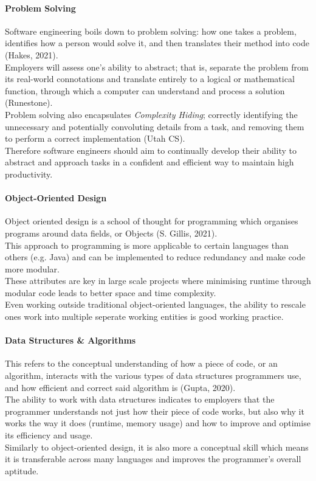 \documentclass[a4paper, 11pt]{report}
\begin{document}
	\paragraph{Problem Solving} Software engineering boils down to problem solving: how one takes a problem, identifies how a person would solve it, and then translates their method into code (Hakes, 2021).
	\\Employers will assess one's ability to abstract; that is, separate the problem from its real-world connotations and translate entirely to a logical or mathematical function, through which a computer can understand and process a solution (Runestone).
	\\Problem solving also encapsulates \textit{Complexity Hiding}; correctly identifying the unnecessary and potentially convoluting details from a task, and removing them to perform a correct implementation (Utah CS).
	\\Therefore software engineers should aim to continually develop their ability to abstract and approach tasks in a confident and efficient way to maintain high productivity.

	\paragraph{Object-Oriented Design} Object oriented design is a school of thought for programming which organises programs around data fields, or Objects (S. Gillis, 2021).
	\\This approach to programming is more applicable to certain languages than others (e.g. Java) and can be implemented to reduce redundancy and make code more modular.
	\\These attributes are key in large scale projects where minimising runtime through modular code leads to better space and time complexity.
	\\Even working outside traditional object-oriented languages, the ability to rescale ones work into multiple seperate working entities is good working practice.

	\paragraph{Data Structures \& Algorithms} This refers to the conceptual understanding of how a piece of code, or an algorithm, interacts with the various types of data structures programmers use, and how efficient and correct said algorithm is (Gupta, 2020).
	\\The ability to work with data structures indicates to employers that the programmer understands not just how their piece of code works, but also why it works the way it does (runtime, memory usage) and how to improve and optimise its efficiency and usage.
	\\Similarly to object-oriented design, it is also more a conceptual skill which means it is transferable across many languages and improves the programmer's overall aptitude.
\end{document}
